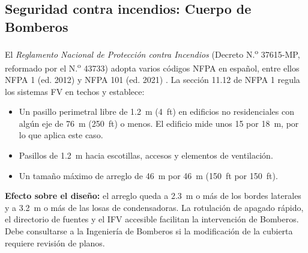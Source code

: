 \documentclass[12pt]{article}
\begin{document}
\subsection{Seguridad contra incendios: Cuerpo de Bomberos}
El \emph{Reglamento Nacional de Protección contra Incendios} (Decreto N.\textsuperscript{o} 37615-MP, reformado por el N.\textsuperscript{o} 43733) adopta varios códigos NFPA en español, entre ellos NFPA 1 (ed. 2012) y NFPA 101 (ed. 2021) \cite{rnpci}. La sección 11.12 de NFPA 1 \cite{nfpa1} regula los sistemas FV en techos y establece:
\begin{itemize}
\item Un pasillo perimetral libre de \SI{1.2}{\meter} (4~ft) en edificios no residenciales con algún eje de 76~m (250~ft) o menos. El edificio mide unos 15 por 18~m, por lo que aplica este caso.
\item Pasillos de \SI{1.2}{\meter} hacia escotillas, accesos y elementos de ventilación.
\item Un tamaño máximo de arreglo de 46~m por 46~m (150~ft por 150~ft).
\end{itemize}

\textbf{Efecto sobre el diseño:} el arreglo queda a \SI{2.3}{\meter} o más de los bordes laterales y a \SI{3.2}{\meter} o más de las losas de condensadoras. La rotulación de apagado rápido, el directorio de fuentes y el IFV accesible facilitan la intervención de Bomberos. Debe consultarse a la Ingeniería de Bomberos si la modificación de la cubierta requiere revisión de planos.
\end{document}
